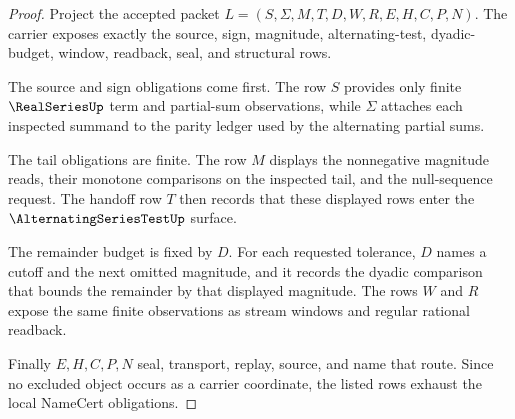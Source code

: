 \begin{proof}
Project the accepted packet $L=(S,\Sigma,M,T,D,W,R,E,H,C,P,N)$. The carrier exposes exactly the source, sign, magnitude, alternating-test, dyadic-budget, window, readback, seal, and structural rows.

The source and sign obligations come first. The row $S$ provides only finite $\RealSeriesUp$ term and partial-sum observations, while $\Sigma$ attaches each inspected summand to the parity ledger used by the alternating partial sums.

The tail obligations are finite. The row $M$ displays the nonnegative magnitude reads, their monotone comparisons on the inspected tail, and the null-sequence request. The handoff row $T$ then records that these displayed rows enter the $\AlternatingSeriesTestUp$ surface.

The remainder budget is fixed by $D$. For each requested tolerance, $D$ names a cutoff and the next omitted magnitude, and it records the dyadic comparison that bounds the remainder by that displayed magnitude. The rows $W$ and $R$ expose the same finite observations as stream windows and regular rational readback.

Finally $E,H,C,P,N$ seal, transport, replay, source, and name that route. Since no excluded object occurs as a carrier coordinate, the listed rows exhaust the local NameCert obligations.
\end{proof}

